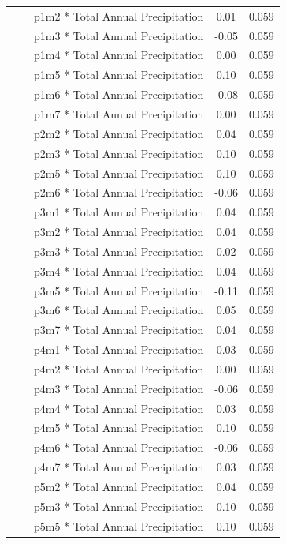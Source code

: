 \documentclass[
]{agujournal2019}
\begin{document}
\begin{longtable*}{lcc}
    p1m2 * Total Annual Precipitation & 0.01 & 0.059 \\ 
    p1m3 * Total Annual Precipitation & -0.05 & 0.059 \\ 
    p1m4 * Total Annual Precipitation & 0.00 & 0.059 \\ 
    p1m5 * Total Annual Precipitation & 0.10 & 0.059 \\ 
    p1m6 * Total Annual Precipitation & -0.08 & 0.059 \\ 
    p1m7 * Total Annual Precipitation & 0.00 & 0.059 \\ 
    p2m2 * Total Annual Precipitation & 0.04 & 0.059 \\ 
    p2m3 * Total Annual Precipitation & 0.10 & 0.059 \\ 
    p2m5 * Total Annual Precipitation & 0.10 & 0.059 \\ 
    p2m6 * Total Annual Precipitation & -0.06 & 0.059 \\ 
    p3m1 * Total Annual Precipitation & 0.04 & 0.059 \\ 
    p3m2 * Total Annual Precipitation & 0.04 & 0.059 \\ 
    p3m3 * Total Annual Precipitation & 0.02 & 0.059 \\ 
    p3m4 * Total Annual Precipitation & 0.04 & 0.059 \\ 
    p3m5 * Total Annual Precipitation & -0.11 & 0.059 \\ 
    p3m6 * Total Annual Precipitation & 0.05 & 0.059 \\ 
    p3m7 * Total Annual Precipitation & 0.04 & 0.059 \\ 
    p4m1 * Total Annual Precipitation & 0.03 & 0.059 \\ 
    p4m2 * Total Annual Precipitation & 0.00 & 0.059 \\ 
    p4m3 * Total Annual Precipitation & -0.06 & 0.059 \\ 
    p4m4 * Total Annual Precipitation & 0.03 & 0.059 \\ 
    p4m5 * Total Annual Precipitation & 0.10 & 0.059 \\ 
    p4m6 * Total Annual Precipitation & -0.06 & 0.059 \\ 
    p4m7 * Total Annual Precipitation & 0.03 & 0.059 \\ 
    p5m2 * Total Annual Precipitation & 0.04 & 0.059 \\ 
    p5m3 * Total Annual Precipitation & 0.10 & 0.059 \\ 
    p5m5 * Total Annual Precipitation & 0.10 & 0.059 \\ 

\end{longtable*}
\end{document}
